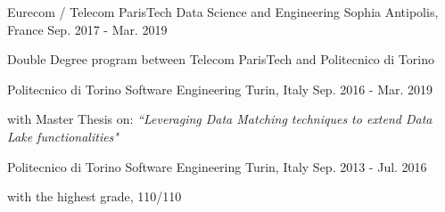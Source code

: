 

\begin{cventries}

  \cventry
    {Eurecom / Telecom ParisTech} %
    { Data Science and Engineering} %
    {Sophia Antipolis, France} %
    {Sep. 2017 - Mar. 2019} %
    {
      \begin{cvitems} %
        \item {Double Degree program between Telecom ParisTech and Politecnico di Torino}
      \end{cvitems}
    }
  
  \cventry
    {Politecnico di Torino}
    { Software Engineering}
    {Turin, Italy}
    {Sep. 2016 - Mar. 2019}
    {
      \begin{cvitems} %
    	\item {with Master Thesis on: \textit{``Leveraging Data Matching techniques to extend Data Lake functionalities"}}
      \end{cvitems}
	}
  
  \cventry
    {Politecnico di Torino}
    { Software Engineering}
    {Turin, Italy}
    {Sep. 2013 - Jul. 2016}
    {
      \begin{cvitems}
        \item {with the highest grade, \textsc{110/110}}
      \end{cvitems}
    }

\end{cventries}
